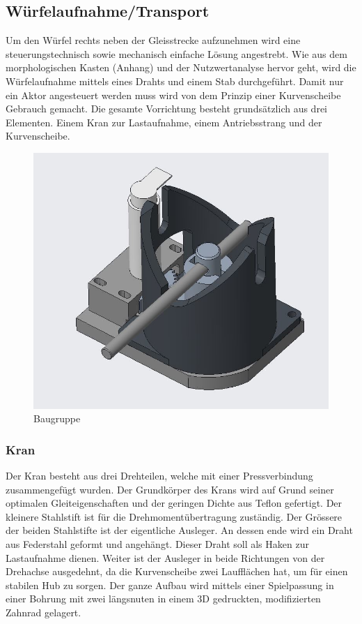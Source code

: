\documentclass[../../main.tex]{subfiles}
\begin{document}
    \subsection{Würfelaufnahme/Transport}
        Um den Würfel rechts neben der Gleisstrecke aufzunehmen wird eine steuerungstechnisch sowie mechanisch einfache Lösung angestrebt. Wie aus dem morphologischen Kasten (Anhang) und der Nutzwertanalyse hervor geht, wird die Würfelaufnahme mittels eines Drahts und einem Stab durchgeführt. Damit nur ein Aktor angesteuert werden muss wird von dem Prinzip einer Kurvenscheibe Gebrauch gemacht.  Die gesamte Vorrichtung besteht grundsätzlich aus drei Elementen. Einem Kran zur Lastaufnahme, einem Antriebsstrang und der Kurvenscheibe.

        \begin{figure}[H]
            \centering
            \includegraphics[width=1.0\textwidth]{../../images/Kran/BG.JPG}
            \caption {Baugruppe}
            \label{fig:et_komponenten}
        \end{figure}

    \subsubsection{Kran}
        Der Kran besteht aus drei Drehteilen, welche mit einer Pressverbindung zusammengefügt wurden. Der Grundkörper des Krans wird auf Grund seiner optimalen Gleiteigenschaften und der geringen Dichte aus Teflon gefertigt. Der kleinere Stahlstift ist für die Drehmomentübertragung zuständig. Der Grössere der beiden Stahlstifte ist der eigentliche Ausleger. An dessen ende wird ein Draht aus Federstahl geformt und angehängt. Dieser Draht soll als Haken zur Lastaufnahme dienen. Weiter ist der Ausleger in beide Richtungen von der Drehachse ausgedehnt, da die Kurvenscheibe zwei Laufflächen hat, um für einen stabilen Hub zu sorgen. Der ganze Aufbau wird mittels einer Spielpassung in einer Bohrung mit zwei längsnuten in einem 3D gedruckten, modifizierten Zahnrad gelagert. 
\end{document}
